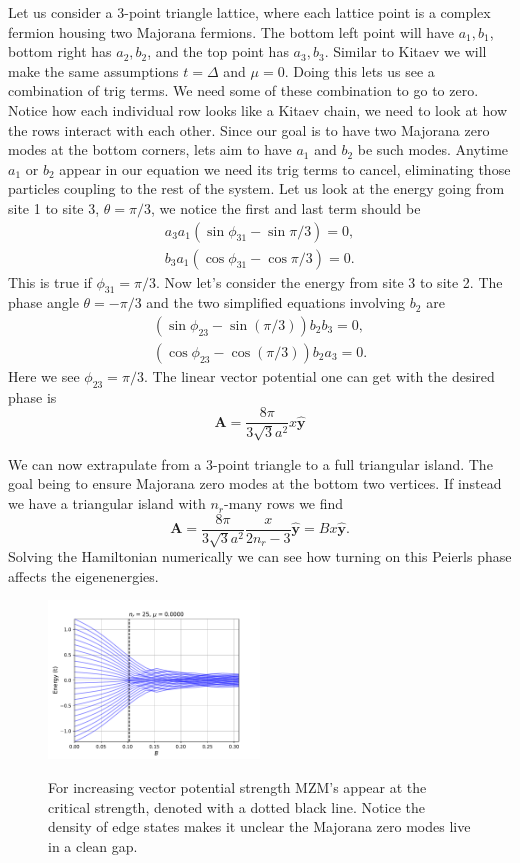 \documentclass[aps,prb,showpacs,twocolumn,amsmath,amssymb,superscriptaddress]{revtex4-2}
\let\oldhat\hat
\renewcommand{\hat}[1]{\oldhat{\mathbf{#1}}}
\renewcommand{\vec}[1]{\mathbf{#1}}
\newcommand{\de}{\Delta}
\begin{document}
Let us consider a 3-point triangle lattice, where each lattice point is a complex fermion housing two Majorana fermions.
The bottom left point will have $a_1, b_1$, bottom right has $a_2, b_2$, and the top point has $a_3, b_3$.
Similar to Kitaev we will make the same assumptions $t=\de$ and $\mu=0$.
Doing this lets us see a combination of trig terms.
We need some of these combination to go to zero.
Notice how each individual row looks like a Kitaev chain, we need to look at how the rows interact with each other.
Since our goal is to have two Majorana zero modes at the bottom corners, lets aim to have $a_1$ and $b_2$ be such modes.
Anytime $a_1$ or $b_2$ appear in our equation we need its trig terms to cancel, eliminating those particles coupling to the rest of the system.
Let us look at the energy going from site 1 to site 3, $\theta = \pi/3$, we notice the first and last term should be
\begin{align}
  a_3 a_1 (\sin\phi_{31} - \sin\pi/3) = 0, \\
  b_3 a_1 (\cos\phi_{31} - \cos\pi/3) = 0.
\end{align}
This is true if $\phi_{31} = \pi/3$.
Now let's consider the energy from site 3 to site 2.
The phase angle $\theta = -\pi/3$ and the two simplified equations involving $b_2$ are
\begin{align}
  (\sin\phi_{23} - \sin(\pi/3)) b_2 b_3 = 0, \nonumber \\
  (\cos\phi_{23} - \cos(\pi/3)) b_2 a_3 = 0. \nonumber
\end{align}
Here we see $\phi_{23} = \pi/3$.
The linear vector potential one can get with the desired phase is
\begin{equation}
  \vec{A} = \dfrac{8 \pi}{3 \sqrt{3} a^2} x \hat{y}
\end{equation}

We can now extrapulate from a 3-point triangle to a full triangular island.
The goal being to ensure Majorana zero modes at the bottom two vertices.
If instead we have a triangular island with $n_r$-many rows we find
\begin{equation}
  \vec{A} = \dfrac{8 \pi}{3 \sqrt{3} a^2} \dfrac{x}{2n_r-3} \hat{y} = Bx\hat{y}.
\end{equation}
Solving the Hamiltonian numerically we can see how turning on this Peierls phase affects the eigenenergies.
\begin{figure}[]
\includegraphics[width=0.5\textwidth]{./figures/nr-25-w-0-spectral-flow.pdf}
\label{fig: full-triangle-spectral}
\caption{For increasing vector potential strength MZM's appear at the critical strength, denoted with a dotted black line. Notice the density of edge states makes it unclear the Majorana zero modes live in a clean gap.}
\end{figure}
\end{document}
